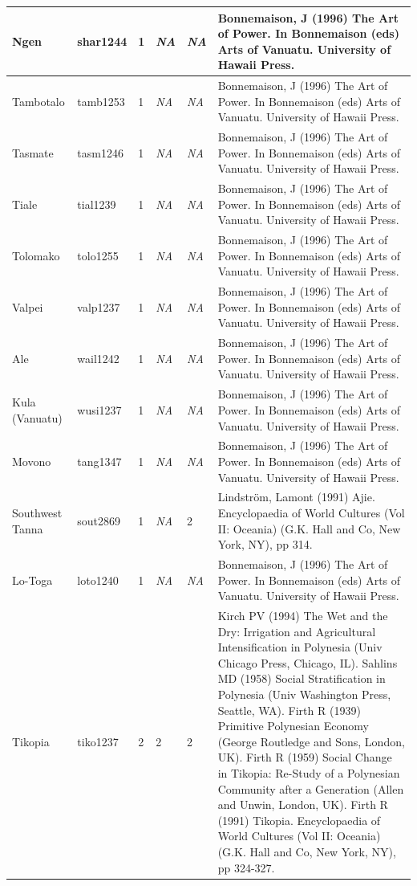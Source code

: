 \documentclass[draft,10pt]{article} %
\begin{document}
\begin{landscape}
\begin{longtable}{ | p{2cm}| p{2cm}| p{1.8cm}| p{1.8cm}| p{3cm}| p{9cm}| }
Ngen&shar1244&1&\emph{NA}&\emph{NA}&Bonnemaison, J (1996) The Art of Power. In Bonnemaison (eds) Arts of Vanuatu. University of Hawaii Press.\\ \hline
Tambotalo&tamb1253&1&\emph{NA}&\emph{NA}&Bonnemaison, J (1996) The Art of Power. In Bonnemaison (eds) Arts of Vanuatu. University of Hawaii Press.\\ \hline
Tasmate&tasm1246&1&\emph{NA}&\emph{NA}&Bonnemaison, J (1996) The Art of Power. In Bonnemaison (eds) Arts of Vanuatu. University of Hawaii Press.\\ \hline
Tiale&tial1239&1&\emph{NA}&\emph{NA}&Bonnemaison, J (1996) The Art of Power. In Bonnemaison (eds) Arts of Vanuatu. University of Hawaii Press.\\ \hline
Tolomako&tolo1255&1&\emph{NA}&\emph{NA}&Bonnemaison, J (1996) The Art of Power. In Bonnemaison (eds) Arts of Vanuatu. University of Hawaii Press.\\ \hline
Valpei&valp1237&1&\emph{NA}&\emph{NA}&Bonnemaison, J (1996) The Art of Power. In Bonnemaison (eds) Arts of Vanuatu. University of Hawaii Press.\\ \hline
Ale&wail1242&1&\emph{NA}&\emph{NA}&Bonnemaison, J (1996) The Art of Power. In Bonnemaison (eds) Arts of Vanuatu. University of Hawaii Press.\\ \hline
Kula (Vanuatu)&wusi1237&1&\emph{NA}&\emph{NA}&Bonnemaison, J (1996) The Art of Power. In Bonnemaison (eds) Arts of Vanuatu. University of Hawaii Press.\\ \hline
Movono&tang1347&1&\emph{NA}&\emph{NA}&Bonnemaison, J (1996) The Art of Power. In Bonnemaison (eds) Arts of Vanuatu. University of Hawaii Press.\\ \hline
Southwest Tanna&sout2869&1&\emph{NA}&2&Lindström, Lamont (1991) Ajie. Encyclopaedia of World Cultures (Vol II: Oceania) (G.K. Hall and Co, New York, NY), pp 314.\\ \hline
Lo-Toga&loto1240&1&\emph{NA}&\emph{NA}&Bonnemaison, J (1996) The Art of Power. In Bonnemaison (eds) Arts of Vanuatu. University of Hawaii Press.\\ \hline
Tikopia&tiko1237&2&2&2&Kirch PV (1994) The Wet and the Dry: Irrigation and Agricultural Intensification in Polynesia (Univ Chicago Press, Chicago, IL). Sahlins MD (1958) Social Stratification in Polynesia (Univ Washington Press, Seattle, WA). Firth R (1939) Primitive Polynesian Economy (George Routledge and Sons, London, UK). Firth R (1959) Social Change in Tikopia: Re-Study of a Polynesian Community after a Generation (Allen and Unwin, London, UK). Firth R (1991) Tikopia. Encyclopaedia of World Cultures (Vol II: Oceania) (G.K. Hall and Co, New York, NY), pp 324-327. \\ \hline

\end{longtable}
\end{landscape}
\end{document}
